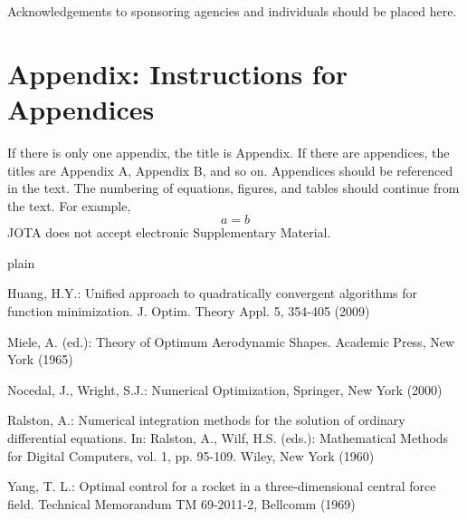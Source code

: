 \documentclass[smallextended,referee,envcountsect,]{svjour3}
\begin{document}
\begin{acknowledgements}
Acknowledgements to sponsoring agencies and individuals should be placed here.
\end{acknowledgements}

\appendix  %
\section*{Appendix:  Instructions for Appendices}
If there is only one appendix, the title is Appendix. If there are appendices, the titles are Appendix A, Appendix B, and so on. Appendices should be referenced in the text. The numbering of equations,  figures, and tables should continue from the  text. For example,
\begin{equation}
a=b
\end{equation}
JOTA does not  accept electronic Supplementary Material.

\begin{thebibliography}{plain}


 Huang, H.Y.: Unified approach to quadratically convergent algorithms for function minimization. J. Optim. Theory Appl. 5, 354-405 (2009)

 Miele, A. (ed.): Theory of Optimum Aerodynamic Shapes. Academic Press, New York (1965)


  Nocedal, J., Wright, S.J.: Numerical Optimization, Springer, New York  (2000)

 Ralston, A.: Numerical integration methods for the solution of ordinary differential equations. In: Ralston, A., Wilf, H.S. (eds.): Mathematical Methods for Digital Computers, vol. 1, pp. 95-109. Wiley, New York (1960)

 Yang, T. L.: Optimal control for a rocket in a three-dimensional central force field. Technical Memorandum TM 69-2011-2, Bellcomm (1969)


\end{thebibliography}
\end{document}
